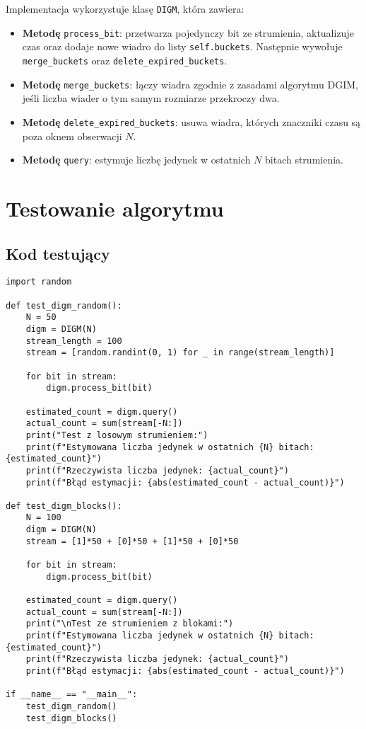 \documentclass{article}
\begin{document}
Implementacja wykorzystuje klasę \texttt{DIGM}, która zawiera:

\begin{itemize}
    \item \textbf{Metodę} \texttt{process\_bit}: przetwarza pojedynczy bit ze strumienia, aktualizuje czas oraz dodaje nowe wiadro do listy \texttt{self.buckets}. Następnie wywołuje \texttt{merge\_buckets} oraz \texttt{delete\_expired\_buckets}.
    \item \textbf{Metodę} \texttt{merge\_buckets}: łączy wiadra zgodnie z zasadami algorytmu DGIM, jeśli liczba wiader o tym samym rozmiarze przekroczy dwa.
    \item \textbf{Metodę} \texttt{delete\_expired\_buckets}: usuwa wiadra, których znaczniki czasu są poza oknem obserwacji $N$.
    \item \textbf{Metodę} \texttt{query}: estymuje liczbę jedynek w ostatnich $N$ bitach strumienia.
\end{itemize}

\newpage

\section{Testowanie algorytmu}

\subsection{Kod testujący}

\begin{lstlisting}[style=pystyle, caption=Kod testujący algorytm]
import random

def test_digm_random():
    N = 50
    digm = DIGM(N)
    stream_length = 100
    stream = [random.randint(0, 1) for _ in range(stream_length)]

    for bit in stream:
        digm.process_bit(bit)

    estimated_count = digm.query()
    actual_count = sum(stream[-N:])
    print("Test z losowym strumieniem:")
    print(f"Estymowana liczba jedynek w ostatnich {N} bitach: {estimated_count}")
    print(f"Rzeczywista liczba jedynek: {actual_count}")
    print(f"Błąd estymacji: {abs(estimated_count - actual_count)}")

def test_digm_blocks():
    N = 100
    digm = DIGM(N)
    stream = [1]*50 + [0]*50 + [1]*50 + [0]*50

    for bit in stream:
        digm.process_bit(bit)

    estimated_count = digm.query()
    actual_count = sum(stream[-N:])
    print("\nTest ze strumieniem z blokami:")
    print(f"Estymowana liczba jedynek w ostatnich {N} bitach: {estimated_count}")
    print(f"Rzeczywista liczba jedynek: {actual_count}")
    print(f"Błąd estymacji: {abs(estimated_count - actual_count)}")

if __name__ == "__main__":
    test_digm_random()
    test_digm_blocks()
\end{lstlisting}
\end{document}
